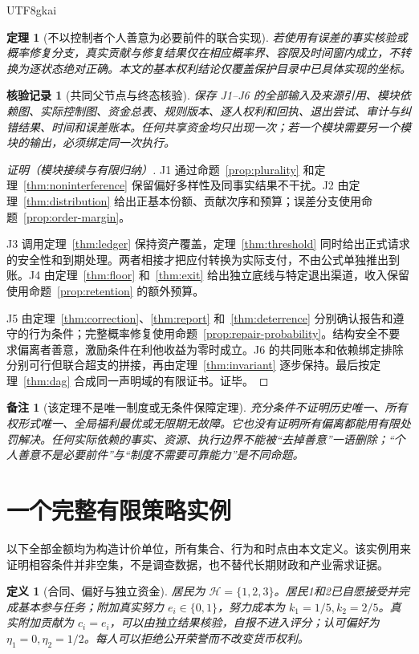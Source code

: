 \documentclass[12pt,a4paper,openany]{report}
\newtheorem{definition}{定义}[chapter]
\newtheorem{theorem}{定理}[chapter]
\newtheorem{remark}{备注}[chapter]
\newtheorem{Certificate}{核验记录}[chapter]
\newcommand{\Hist}{\mathcal H}
\begin{document}
\begin{CJK*}{UTF8}{gkai}
\begin{theorem}[不以控制者个人善意为必要前件的联合实现]
若使用有误差的事实核验或概率修复分支，真实贡献与修复结果仅在相应概率界、容限及时间窗内成立，不转换为逐状态绝对正确。本文的基本权利结论仅覆盖保护目录中已具体实现的坐标。
\end{theorem}
\begin{Certificate}[共同父节点与终态核验]
保存 J1--J6 的全部输入及来源引用、模块依赖图、实际控制图、资金总表、规则版本、逐人权利和回执、退出尝试、审计与纠错结果、时间和误差账本。任何共享资金均只出现一次；若一个模块需要另一个模块的输出，必须绑定同一次执行。
\end{Certificate}
\begin{proof}[证明（模块接续与有限归纳）]
J1 通过命题~\ref{prop:plurality} 和定理~\ref{thm:noninterference} 保留偏好多样性及同事实结果不干扰。J2 由定理~\ref{thm:distribution} 给出正基本份额、贡献次序和预算；误差分支使用命题~\ref{prop:order-margin}。

J3 调用定理~\ref{thm:ledger} 保持资产覆盖，定理~\ref{thm:threshold} 同时给出正式请求的安全性和到期处理。两者相接才把应付转换为实际支付，不由公式单独推出到账。J4 由定理~\ref{thm:floor} 和~\ref{thm:exit} 给出独立底线与特定退出渠道，收入保留使用命题~\ref{prop:retention} 的额外预算。

J5 由定理~\ref{thm:correction}、\ref{thm:report} 和~\ref{thm:deterrence} 分别确认报告和遵守的行为条件；完整概率修复使用命题~\ref{prop:repair-probability}。结构安全不要求偏离者善意，激励条件在利他收益为零时成立。J6 的共同账本和依赖绑定排除分别可行但联合超支的拼接，再由定理~\ref{thm:invariant} 逐步保持。最后按定理~\ref{thm:dag} 合成同一声明域的有限证书。证毕。
\end{proof}

\begin{remark}[该定理不是唯一制度或无条件保障定理]
充分条件不证明历史唯一、所有权形式唯一、全局福利最优或无限期无故障。它也没有证明所有偏离都能用有限处罚解决。任何实际依赖的事实、资源、执行边界不能被“去掉善意”一语删除；“个人善意不是必要前件”与“制度不需要可靠能力”是不同命题。
\end{remark}

\section{一个完整有限策略实例}
以下全部金额均为构造计价单位，所有集合、行为和时点由本文定义。该实例用来证明相容条件并非空集，不是调查数据，也不替代长期财政和产业需求证据。

\begin{definition}[合同、偏好与独立资金]
\label{def:example}
居民为 $\Hist=\{1,2,3\}$。居民1和2已自愿接受并完成基本参与任务；附加真实努力 $e_i\in\{0,1\}$，努力成本为 $k_1=1/5,k_2=2/5$。真实附加贡献为 $c_i=e_i$，可以由独立结果核验，自报不进入评分；认可偏好为 $\eta_1=0,\eta_2=1/2$。每人可以拒绝公开荣誉而不改变货币权利。


\end{definition}
\end{CJK*}
\end{document}
